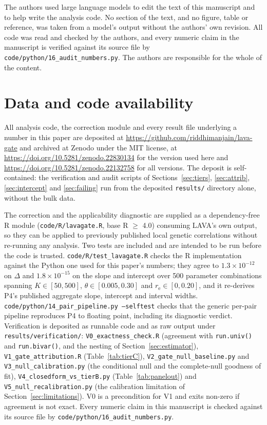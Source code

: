 \documentclass[12pt,a4paper]{article}
\newcommand{\re}{r_{\mathrm{e}}}
\begin{document}
The authors used large language models to edit the text of this manuscript and to help
write the analysis code. No section of the text, and no figure, table or reference, was
taken from a model's output without the authors' own revision. All code was read and
checked by the authors, and every numeric claim in the manuscript is verified against its
source file by \texttt{code/python/16\_audit\_numbers.py}. The authors are responsible for
the whole of the content.

\section*{Data and code availability}

\noindent All analysis code, the correction module and every result file underlying a
number in this paper are deposited at \url{https://github.com/riddhimanjain/lava-gate} and
archived at Zenodo \citep{refdata} under the MIT license, at
\url{https://doi.org/10.5281/zenodo.22830134} for the version used here and
\url{https://doi.org/10.5281/zenodo.22132758} for all versions. The deposit is
self-contained: the verification and audit scripts of Sections~\ref{sec:tiers},
\ref{sec:attrib}, \ref{sec:intercept} and \ref{sec:failing} run from the deposited
\texttt{results/} directory alone, without the bulk data.

The correction and the applicability diagnostic are supplied as a dependency-free R module
(\texttt{code/R/lavagate.R}, base R $\ge$ 4.0) consuming LAVA's own output, so they can be
applied to previously published local genetic correlations without re-running any
analysis. Two tests are included and are intended to be run before the code is trusted.
\texttt{code/R/test\_lavagate.R} checks the R implementation against the Python one used
for this paper's numbers; they agree to $1.3\times10^{-12}$ on $\Delta$ and
$1.8\times10^{-15}$ on the slope and intercept over 500 parameter combinations spanning
$K\in[50,500]$, $\theta\in[0.005,0.30]$ and $\re\in[0,0.20]$, and it re-derives P4's
published aggregate slope, intercept and interval widths.
\texttt{code/python/14\_pair\_pipeline.py --selftest} checks that the generic per-pair
pipeline reproduces P4 to floating point, including its diagnostic verdict. Verification
is deposited as runnable code and as raw output under \texttt{results/verification/}:
\texttt{V0\_exactness\_check.R} (agreement with \texttt{run.univ()} and
\texttt{run.bivar()}, and the nesting of Section~\ref{sec:estimator}),
\texttt{V1\_gate\_attribution.R} (Table~\ref{tab:tierC}),
\texttt{V2\_gate\_null\_baseline.py} and \texttt{V3\_null\_calibration.py} (the conditional
null and the complete-null goodness of fit), \texttt{V4\_closedform\_vs\_tierB.py}
(Table~\ref{tab:panelout}) and \texttt{V5\_null\_recalibration.py} (the calibration
limitation of Section~\ref{sec:limitations}). V0 is a precondition for V1 and exits
non-zero if agreement is not exact. Every numeric claim in this manuscript is checked
against its source file by \texttt{code/python/16\_audit\_numbers.py}.
\end{document}
